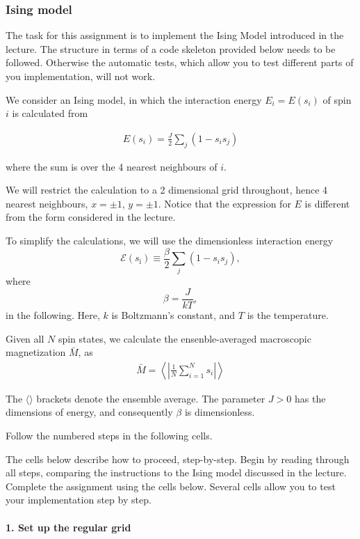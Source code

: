 \documentclass[11pt]{article}
\begin{document}
    \hypertarget{ising-model}{%
\subsubsection{Ising model}\label{ising-model}}

The task for this assignment is to implement the Ising Model introduced
in the lecture. The structure in terms of a code skeleton provided below
needs to be followed. Otherwise the automatic tests, which allow you to
test different parts of you implementation, will not work.

We consider an Ising model, in which the interaction energy
\(E_i=E(s_i)\) of spin \(i\) is calculated from

\begin{align}
E(s_{i}) = \frac{J}{2} \sum\limits_{j} (1-s_{i} s_{j})
\end{align}

where the sum is over the 4 nearest neighbours of \(i\).

We will restrict the calculation to a 2 dimensional grid throughout,
hence 4 nearest neighbours, \(x=\pm 1\), \(y=\pm 1\). Notice that the
expression for \(E\) is different from the form considered in the
lecture.

To simplify the calculations, we will use the dimensionless interaction
energy \[
\mathcal{E}(s_\mathrm{i})  \equiv \frac{\beta}{2} \sum\limits_{j} (1-s_{i} s_{j}),
\] where \[
\beta = \frac{J}{kT},
\] in the following. Here, \(k\) is Boltzmann's constant, and \(T\) is
the temperature.

Given all \(N\) spin states, we calculate the ensenble-averaged
macroscopic magnetization \(\bar{M}\), as \begin{align}
\bar{M} = \left\langle\left|\frac{1}{N}\sum_{i=1}^N s_{i}\right|\right\rangle
\end{align}

The \(\langle\rangle\) brackets denote the ensemble average. The
parameter \(J>0\) has the dimensions of energy, and consequently
\(\beta\) is dimensionless.

Follow the numbered steps in the following cells.

    The cells below describe how to proceed, step-by-step. Begin by reading
through all steps, comparing the instructions to the Ising model
discussed in the lecture. Complete the assignment using the cells below.
Several cells allow you to test your implementation step by step.

    \hypertarget{set-up-the-regular-grid}{%
\paragraph{1. Set up the regular grid}\label{set-up-the-regular-grid}}
\end{document}
